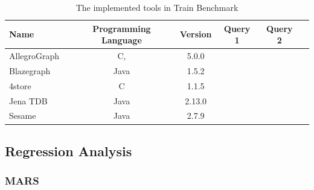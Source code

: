 \begin{table}[ht]
	\footnotesize
	\centering
	
	\begin{tabular}{ l c c c c c}
		\toprule
		Name & Programming Language& Version & Query 1 & Query 2\\ 
		\midrule 
		AllegroGraph~\cite{allegro} & C, \CC & 5.0.0  & \textbullet&  \textbullet \\ \hline
		Blazegraph~\cite{blaze} & Java  & 1.5.2 & \textbullet & \textbullet\\ \hline
		4store~\cite{4store} & C  & 1.1.5 & & \textbullet \\ \hline
		Jena TDB~\cite{jena_tdb} & Java & 2.13.0 & \textbullet & \textbullet\\ \hline
		Sesame~\cite{sesame} & Java & 2.7.9 & \textbullet & \textbullet\\ \hline
		\bottomrule
	\end{tabular}
	\caption{The implemented tools in Train Benchmark}
	\label{tab:tools}
\end{table}


\subsection{Regression Analysis}

\subsubsection{MARS}


